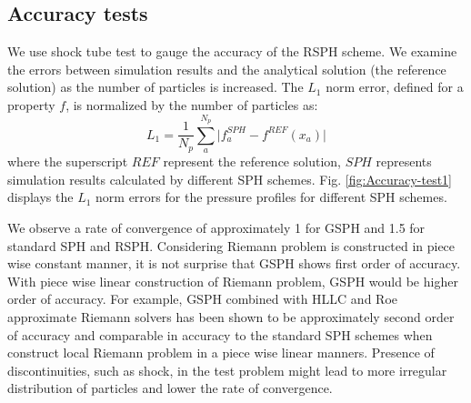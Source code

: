 \documentclass[preprint,12pt,authoryear]{elsarticle}
\begin{document}
\subsection{Accuracy tests}
We use shock tube test to gauge the accuracy of the RSPH scheme.
We examine the errors between simulation results and the analytical solution (the reference solution) as the number of particles is increased. The $L_1$ norm error, defined for a property $f$, is normalized by the number of particles as:
\begin{equation}
L_1= \frac{1}{N_p} \sum_a^{N_p} \vert f_a^{SPH} - f^{REF} (x_a) \vert 
\end{equation}
where the superscript $REF$ represent the reference solution, $SPH$ represents simulation results calculated by different SPH schemes. Fig. \ref{fig:Accuracy-test1} displays the $L_1$ norm errors for the pressure profiles for different SPH schemes.


We observe a rate of convergence of approximately 1 for GSPH and 1.5 for standard SPH and RSPH.  Considering Riemann problem is constructed in piece wise constant manner, it is not surprise that GSPH shows first order of accuracy. With piece wise linear construction of Riemann problem, GSPH would be higher order of accuracy. For example,
GSPH combined with HLLC and Roe approximate Riemann solvers has been shown to be approximately second order of accuracy \citep{puri2014comparison} and comparable in accuracy to the standard SPH schemes when construct local Riemann problem in a piece wise linear manners. Presence of discontinuities, such as shock, in the test problem might lead to more irregular distribution of particles and lower the rate of convergence. 
\end{document}
